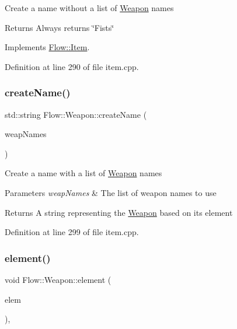 Create a name without a list of \hyperlink{class_flow_1_1_weapon}{Weapon} names \begin{DoxyReturn}{Returns}
Always returns \char`\"{}\+Fists\char`\"{} 
\end{DoxyReturn}


Implements \hyperlink{class_flow_1_1_item_a775605940d8a063e7cf5c7d87820d4d1}{Flow\+::\+Item}.



Definition at line 290 of file item.\+cpp.

\hypertarget{class_flow_1_1_weapon_acd4f51875ed9488e144ea7475ebb1760}{}\label{class_flow_1_1_weapon_acd4f51875ed9488e144ea7475ebb1760} 
\subsubsection{\texorpdfstring{create\+Name()}{createName()}\hspace{0.1cm}{\footnotesize\ttfamily [2/2]}}
{\footnotesize\ttfamily std\+::string Flow\+::\+Weapon\+::create\+Name (\begin{DoxyParamCaption}\item[{const \hyperlink{class_collections_1_1_linked_list}{Collections\+::\+Linked\+List}$<$ std\+::string $>$ \&}]{weap\+Names }\end{DoxyParamCaption})\hspace{0.3cm}{\ttfamily [protected]}}

Create a name with a list of \hyperlink{class_flow_1_1_weapon}{Weapon} names 
\begin{DoxyParams}{Parameters}
{\em weap\+Names} & The list of weapon names to use \\
\hline
\end{DoxyParams}
\begin{DoxyReturn}{Returns}
A string representing the \hyperlink{class_flow_1_1_weapon}{Weapon} based on its element 
\end{DoxyReturn}


Definition at line 299 of file item.\+cpp.

\hypertarget{class_flow_1_1_weapon_a5e008e915610d3ba9d38fed417c807b8}{}\label{class_flow_1_1_weapon_a5e008e915610d3ba9d38fed417c807b8} 
\subsubsection{\texorpdfstring{element()}{element()}\hspace{0.1cm}{\footnotesize\ttfamily [1/3]}}
{\footnotesize\ttfamily void Flow\+::\+Weapon\+::element (\begin{DoxyParamCaption}\item[{unsigned char}]{elem }\end{DoxyParamCaption})\hspace{0.3cm}{\ttfamily [override]}, {\ttfamily [virtual]}}

